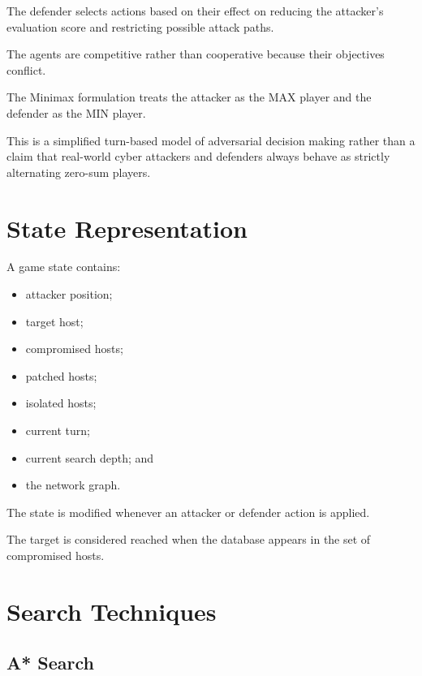 \documentclass[12pt,a4paper]{article}
\begin{document}
The defender selects actions based on their effect on reducing the attacker's
evaluation score and restricting possible attack paths.

The agents are competitive rather than cooperative because their objectives
conflict.

The Minimax formulation treats the attacker as the MAX player and the
defender as the MIN player.

This is a simplified turn-based model of adversarial decision making rather
than a claim that real-world cyber attackers and defenders always behave as
strictly alternating zero-sum players.


\section{State Representation}

A game state contains:

\begin{itemize}
    \item attacker position;
    \item target host;
    \item compromised hosts;
    \item patched hosts;
    \item isolated hosts;
    \item current turn;
    \item current search depth; and
    \item the network graph.
\end{itemize}

The state is modified whenever an attacker or defender action is applied.

The target is considered reached when the database appears in the set of
compromised hosts.


\section{Search Techniques}

\subsection{A* Search}
\end{document}
